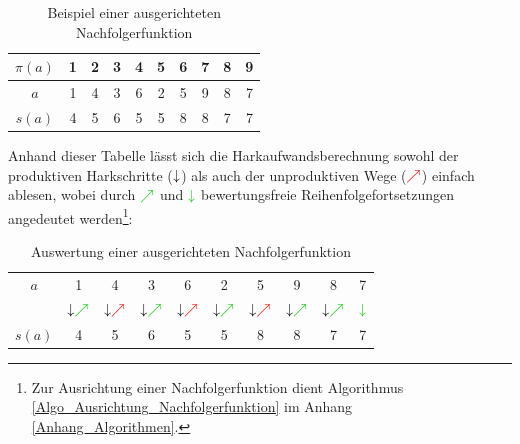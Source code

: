 \documentclass[fontsize=12pt,doubleside,openany,listof=totoc,listof=flat,listof=nochaptergap,numbers=noenddot]{scrbook}
\theoremstyle{style}
\begin{document}
\renewcommand{\arraystretch}{1}
\begin{table}[H]
\caption{Beispiel einer ausgerichteten Nachfolgerfunktion}
\label{table_Beispiel_ausgerichtete_Nachfolgerfunktion}
\centering 
\begin{tabular}{|>{}c|>{}c|>{}c|>{}c|>{}c|>{}c|>{}c|>{}c|>{}c|>{}c|}
\hline
$\pi(a)$ &1 &2 &3 &4 &5 &6 &7 &8 &9\\
\hline
$a$     &1 &4 &3 &6 &2 &5 &9 &8 &7\\
\hline
$s(a)$ &4 &5 &6 &5 &5 &8 &8 &7 &7\\
\hline
\end{tabular}
\end{table}
\renewcommand{\arraystretch}{1}

\noindent Anhand dieser Tabelle lässt sich die Harkaufwandsberechnung sowohl der produktiven Harkschritte ($\bf{\downarrow}$) als auch der unproduktiven Wege ($\textcolor{red}{\bf{\nearrow}}$) einfach ablesen, wobei durch $\textcolor{green!80!black}{\bf{\nearrow}}$ und $\textcolor{green!80!black}{\bf{\downarrow}}$ bewertungsfreie Reihenfolgefortsetzungen angedeutet werden\footnote{Zur Ausrichtung einer Nachfolgerfunktion dient Algorithmus \ref{Algo_Ausrichtung_Nachfolgerfunktion} im Anhang \ref{Anhang_Algorithmen}.}:

\renewcommand{\arraystretch}{1}
\begin{table}[H]
\caption{Auswertung einer ausgerichteten Nachfolgerfunktion}
\label{table_Auswertung_ausgerichtete_Nachfolgerfunktion}
\centering 
\begin{tabular}{|>{}c|>{}c|>{}c|>{}c|>{}c|>{}c|>{}c|>{}c|>{}c|>{}c|}
\hline
$a$ &1 &4 &3 &6 &2 &5 &9 &8 &7\\
&$\bf{\downarrow} \textcolor{green!80!black}{\bf{\nearrow}}$ 
&$\bf{\downarrow} \textcolor{red}{\bf{\nearrow}}$ 
&$\bf{\downarrow} \textcolor{green!80!black}{\bf{\nearrow}}$ 
&$\bf{\downarrow} \textcolor{red}{\bf{\nearrow}}$ 
&$\bf{\downarrow} \textcolor{green!80!black}{\bf{\nearrow}}$ 
&$\bf{\downarrow} \textcolor{red}{\bf{\nearrow}}$ 
&$\bf{\downarrow} \textcolor{green!80!black}{\bf{\nearrow}}$ 
&$\bf{\downarrow} \textcolor{green!80!black}{\bf{\nearrow}}$
& $\textcolor{green!80!black}{\bf{\downarrow}}$\\
$s(a)$ &4 &5 &6 &5 &5 &8 &8 &7 &7\\
\hline
\end{tabular}
\end{table}
\renewcommand{\arraystretch}{1}
\end{document}
